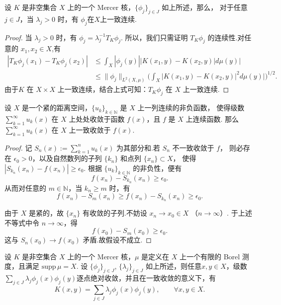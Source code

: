 \documentclass[../master.tex]{subfiles}
\begin{document}
\begin{lemma}\label{lemma: phi_j连续性}
设 $K$ 是非空集合 $X$ 上的一个 Mercer 核，$\{\phi_j\}_{j\in J}$ 如上所述，那么，
对于任意 $j\in J$，当 $\lambda_j>0$ 时，有 $\phi_j$在$X$上一致连续.
\end{lemma}

\begin{proof}
    当  $\lambda _{j}> 0$ 时，有 $\phi_j=\lambda_j^{-1}T_{K}\phi_{j}.$ 所以，我们只需证明 $T_K\phi_{j}$ 的连续性.对任意的 $x_1,x_2\in X$,有
$$\begin{aligned}|T_{K}\phi_{j}(x_{1})-T_{K}\phi_{j}(x_{2})|&\leq\int_{X}|\phi_{j}(y)||K(x_{1},y)-K(x_{2},y)|d\mu(y)|\\&\leq\|\phi_j\|_{L^2(X,\mu)}\Big(\int_X|K(x_1,y)-K(x_2,y)|^2d\mu(y)|\Big)^{1/2}.\end{aligned}$$
由于$K$ 在 $X\times X$ 上一致连续，结合上式可知：$T_K\phi_j$ 在 $X$ 上一致连续.
\end{proof}

\begin{lemma}[Dini]\label{lemma:Dini}
设 $X$ 是一个紧的距离空间，$\{u_k\}_{k\in\mathbb{N}}$ 是 $X$ 上一列连续的非负函数，
使得级数 $\sum_{k=1}^\infty u_k(x)$ 在 $X$ 上处处收敛于函数 $f(x)$，且 $f$ 是 $X$ 上连续函数.
那么 $\sum_{k=1}^\infty u_k(x)$ 在 $X$ 上一致收敛于 $f(x)$.
\end{lemma}

\begin{proof}
记 $S_n(x):=\sum_{k=1}^n u_k(x)$ 为其部分和.若 $S_n$ 不一致收敛于 $f$，
则必存在 $\epsilon_0>0$，以及自然数列的子列 $\{k_n\}$ 和点列 $\{x_n\}\subset X$，
使得 $|S_{k_n}(x_n)-f(x_n)|\ge \epsilon_0$.
根据 $\{u_k\}_{k\in\mathbb{N}}$ 的非负性，便有
\[
f(x_n)-S_{k_n}(x_n)\ge \epsilon_0.
\]
从而对任意的 $m\in\mathbb{N}$，当 $k_n\ge m$ 时，有
\[
f(x_n)-S_m(x_n)\ge f(x_n)-S_{k_n}(x_n)\ge \epsilon_0.
\]

由于 $X$ 是紧的，故 $\{x_n\}$ 有收敛的子列.不妨设 $x_n\to x_0\in X$ （$n\to\infty$）.
于上述不等式中令 $n\to\infty$，得
\[
f(x_0)-S_m(x_0)\ge \epsilon_0.
\]
这与 $S_n(x_0)\to f(x_0)$ 矛盾.故假设不成立.
\end{proof}



\begin{theorem}[Mercer 定理]\label{thm:mercer}
设 $K$ 是非空集合 $X$ 上的一个 Mercer 核，$\mu$ 是定义在 $X$ 上一个有限的 Borel 测度，且满足 $\mathrm{supp}\,\mu = X$.
设 $\{\phi_j\}_{j\in J}$, $\{\lambda_j\}_{j\in J}$ 如上所述，则任意$x,y\in X$，级数$\sum_{j\in J} \lambda_j \phi_j(x)\phi_j(y)$逐点绝对收敛，并且在一致收敛的意义下，有
\begin{equation}\label{eq:mercer}
    K(x,y) = \sum_{j\in J} \lambda_j \phi_j(x)\phi_j(y), 
    \qquad \forall x,y \in X.
\end{equation}
\end{theorem}
\end{document}
